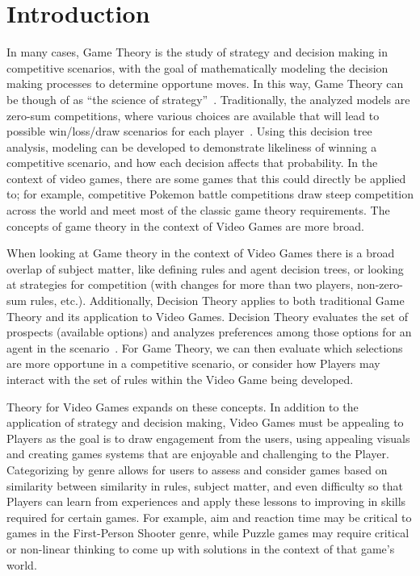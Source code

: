 
\section{Introduction}
In many cases, Game Theory is the study of strategy and
decision making in competitive scenarios, with the goal of
mathematically modeling the decision making processes to
determine opportune moves. In this way, Game Theory can
be though of as ``the science of strategy''~\cite{b3}.
Traditionally, the analyzed models are zero-sum competitions,
where various choices are available
that will lead to possible win/loss/draw scenarios for each
player~\cite{b1}. Using this decision tree analysis, modeling can be
developed to demonstrate likeliness of winning a competitive
scenario, and how each decision affects that probability. In
the context of video games, there are some games that this
could directly be applied to; for example, competitive Pokemon
battle competitions draw steep competition across the world
and meet most of the classic game theory requirements. The
concepts of game theory in the context of Video Games are more
broad. 

When looking at Game theory in the context of Video Games
there is a broad overlap of  subject matter, like defining
rules and agent decision trees, or looking at strategies for
competition (with changes for more than two players,
non-zero-sum rules, etc.). Additionally, Decision Theory
applies to both traditional Game Theory and its application to
Video Games. Decision Theory evaluates the set of prospects
(available options) and analyzes preferences among those
options for an agent in the scenario~\cite{b2}. For Game
Theory, we can then evaluate which selections are more
opportune in a competitive scenario, or consider how Players
may interact with the set of rules within the Video Game
being developed.

Theory for Video Games expands on these concepts. In addition
to the application of strategy and decision making, Video
Games must be appealing to Players as the goal is to draw
engagement from the users, using appealing visuals and
creating games systems that are enjoyable and challenging to
the Player. Categorizing by genre allows for users to assess
and consider games based on similarity between similarity in
rules, subject matter, and even difficulty so that Players can
learn from experiences and apply these lessons to improving in
skills required for certain games. For example, aim and
reaction time may be critical to games in the First-Person
Shooter genre, while Puzzle games may require critical or
non-linear thinking to come up with solutions in the context
of that game’s world.

